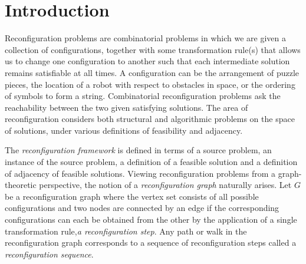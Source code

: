 \chapter{Introduction}
\label{ch:intro}

Reconfiguration problems are combinatorial problems in which we are given a collection of configurations, together with some
transformation rule(s) that allows us to change one configuration to another such that each intermediate solution remains satisfiable at all times.
A configuration can be the arrangement of puzzle pieces, the location of a robot with respect to obstacles in space, or the ordering of symbols to
form a string. Combinatorial reconfiguration problems ask the reachability between the two given satisfying solutions. The area of reconfiguration
considers both structural and algorithmic problems on the space of solutions, under various definitions of feasibility and adjacency.


The \textit{reconfiguration framework} is defined in terms of a source problem, an instance of the source problem, a definition of a feasible solution
and a definition of adjacency of feasible solutions. Viewing reconfiguration problems from a graph-theoretic perspective, the notion of a
\textit{reconfiguration graph} naturally arises. Let $G$ be a reconfiguration graph where the vertex set consists of all
possible configurations and two nodes are connected by an edge if the corresponding configurations can each be obtained from the other by the
application of a single transformation rule,\textit{a reconfiguration step}. Any path or walk in the reconfiguration graph corresponds to a
sequence of reconfiguration steps called a \textit{reconfiguration sequence}.


